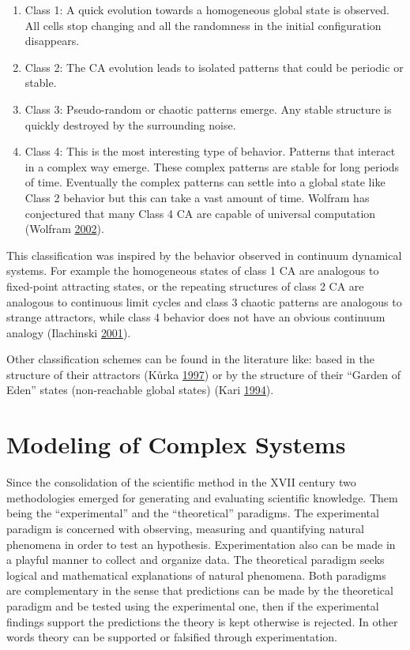 \documentclass[
  openany]{book}
\begin{document}
\begin{enumerate}
\def\labelenumi{\arabic{enumi}.}
\item
  Class 1: A quick evolution towards a homogeneous global state is observed. All cells stop changing and all the randomness in the initial configuration disappears.
\item
  Class 2: The CA evolution leads to isolated patterns that could be periodic or stable.
\item
  Class 3: Pseudo-random or chaotic patterns emerge. Any stable structure is quickly destroyed by the surrounding noise.
\item
  Class 4: This is the most interesting type of behavior. Patterns that interact in a complex way emerge. These complex patterns are stable for long periods of time. Eventually the complex patterns can settle into a global state like Class 2 behavior but this can take a vast amount of time. Wolfram has conjectured that many Class 4
  CA are capable of universal computation (Wolfram \protect\hyperlink{ref-wolfram2002new}{2002}).
\end{enumerate}

This classification was inspired by the behavior observed in continuum dynamical systems. For example the homogeneous states of class 1 CA are analogous to fixed-point attracting states, or the repeating structures of class 2 CA are analogous to continuous limit cycles and class 3 chaotic patterns are analogous to strange attractors, while class 4 behavior does not have an obvious continuum analogy (Ilachinski \protect\hyperlink{ref-ilachinski2001cellular}{2001}).

Other classification schemes can be found in the literature like: based in the structure of their attractors (Kůrka \protect\hyperlink{ref-kuurka1997languages}{1997}) or by the structure of their ``Garden of Eden'' states (non-reachable global states) (Kari \protect\hyperlink{ref-kari1994reversibility}{1994}).

\hypertarget{modeling-of-complex-systems}{%
\section{Modeling of Complex Systems}\label{modeling-of-complex-systems}}

Since the consolidation of the scientific method in the XVII century two methodologies emerged for generating and evaluating scientific knowledge. Them being the ``experimental'' and the ``theoretical'' paradigms. The experimental paradigm is concerned with observing, measuring and quantifying natural phenomena in order to test an hypothesis. Experimentation also can be made in a playful manner to collect and organize data. The theoretical paradigm seeks logical and mathematical explanations of natural phenomena. Both paradigms are complementary in the sense that predictions can be made by the theoretical paradigm and be tested using the experimental one, then if the experimental findings support the predictions the theory is kept otherwise is rejected. In other words theory can be supported or falsified through experimentation.
\end{document}
